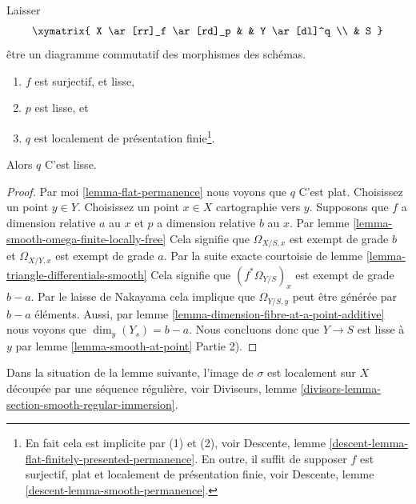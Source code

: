 \begin{lemma}

\label{lemma-smooth-permanence}

Laisser
$$
\xymatrix{
X \ar[rr]_f \ar[rd]_p & &
Y \ar[dl]^q \\
& S
}
$$
être un diagramme commutatif des morphismes des schémas.

\begin{enumerate}

\item  $f$ est surjectif, et lisse,
\item  $p$ est lisse, et
\item  $q$ est localement de présentation finie\footnote{En fait cela est implicite par (1) et (2), voir Descente, lemme \ref{descent-lemma-flat-finitely-presented-permanence}. En outre, il suffit de supposer $f$ est surjectif, plat et localement de présentation finie, voir Descente, lemme \ref{descent-lemma-smooth-permanence}.}.

\end{enumerate}

Alors $q$ C'est lisse.

\end{lemma}

\begin{proof}

Par moi \ref{lemma-flat-permanence} nous voyons que $q$ C'est plat. Choisissez un point $y \in Y$. Choisissez un point $x \in X$ cartographie vers $y$. Supposons que $f$ a dimension relative $a$ au $x$ et $p$ a dimension relative $b$ au $x$. Par lemme \ref{lemma-smooth-omega-finite-locally-free}
Cela signifie que $\Omega_{X/S, x}$ est exempt de grade $b$ et $\Omega_{X/Y, x}$
est exempt de grade $a$. Par la suite exacte courtoisie de lemme \ref{lemma-triangle-differentials-smooth}
Cela signifie que $(f^*\Omega_{Y/S})_x$ est exempt de grade $b - a$. Par le laisse de Nakayama cela implique que
$\Omega_{Y/S, y}$ peut être générée par $b - a$ éléments. Aussi, par lemme \ref{lemma-dimension-fibre-at-a-point-additive} nous voyons que
$\dim_y(Y_s) = b - a$. Nous concluons donc que
$Y \to S$ est lisse à $y$ par lemme \ref{lemma-smooth-at-point} Partie 2).

\end{proof}

\noindent
Dans la situation de la lemme suivante, l'image de $\sigma$ est localement sur $X$ découpée par une séquence régulière, voir Diviseurs, lemme \ref{divisors-lemma-section-smooth-regular-immersion}.

